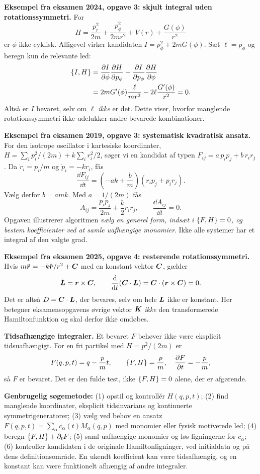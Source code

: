 \textbf{Eksempel fra eksamen 2024, opgave 3: skjult integral uden rotationssymmetri.}
For
\[
H=\frac{p_r^2}{2m}+\frac{p_\phi^2}{2mr^2}+V(r)+\frac{G(\phi)}{r^2}
\]
er $\phi$ ikke cyklisk. Alligevel virker kandidaten
$I=p_\phi^2+2mG(\phi)$. Sæt $\ell=p_\phi$ og beregn kun de relevante led:
\begin{align*}
\left\{I,H\right\}
&=\frac{\partial I}{\partial\phi}\frac{\partial H}{\partial p_\phi}
-\frac{\partial I}{\partial p_\phi}\frac{\partial H}{\partial\phi}\\
&=2mG'(\phi)\frac{\ell}{mr^2}
-2\ell\frac{G'(\phi)}{r^2}=0.
\end{align*}
Altså er $I$ bevaret, selv om $\ell$ \emph{ikke} er det. Dette viser, hvorfor manglende rotationssymmetri ikke udelukker andre bevarede kombinationer.

\textbf{Eksempel fra eksamen 2019, opgave 3: systematisk kvadratisk ansatz.}
For den isotrope oscillator i kartesiske koordinater,
$H=\sum_i p_i^2/(2m)+k\sum_i r_i^2/2$,
søger vi en kandidat af typen
$F_{ij}=a\,p_ip_j+b\,r_ir_j$.
Da $\dot r_i=p_i/m$ og $\dot p_i=-kr_i$, fås
\[
\frac{\dd F_{ij}}{\dd t}
=\left(-ak+\frac bm\right)(r_ip_j+p_ir_j).
\]
Vælg derfor $b=amk$. Med $a=1/(2m)$ fås
\[
\boxed{A_{ij}=\frac{p_ip_j}{2m}+\frac{k}{2}r_ir_j},
\qquad \frac{\dd A_{ij}}{\dd t}=0.
\]
Opgaven illustrerer algoritmen \emph{vælg en generel form, indsæt i $\left\{F,H\right\}=0$, og bestem koefficienter ved at samle uafhængige monomier}. Ikke alle systemer har et integral af den valgte grad.

\textbf{Eksempel fra eksamen 2025, opgave 4: resterende rotationssymmetri.}
Hvis $m\ddot{\boldsymbol{r}}=-k\hat{\boldsymbol{r}}/r^2+\boldsymbol{C}$ med en konstant vektor $\boldsymbol{C}$, gælder
\[
\dot{\boldsymbol{L}}=\boldsymbol{r}\times\boldsymbol{C},\qquad
\frac{\mathrm d}{\mathrm d t}(\boldsymbol{C}\cdot\boldsymbol{L})
=\boldsymbol{C}\cdot(\boldsymbol{r}\times\boldsymbol{C})=0.
\]
Det er altså $D=\boldsymbol{C}\cdot\boldsymbol{L}$, der bevares, selv om hele $\boldsymbol{L}$ ikke er konstant. Her betegner eksamensopgavens øvrige vektor $\boldsymbol{K}$ \emph{ikke} den transformerede Hamiltonfunktion og skal derfor ikke omdøbes.

\textbf{Tidsafhængige integraler.} Et bevaret $F$ behøver ikke være eksplicit tidsuafhængigt. For en fri partikel med $H=p^2/(2m)$ er
\[
F(q,p,t)=q-\frac{p}{m}t,\qquad
\left\{F,H\right\}=\frac pm,\quad \frac{\partial F}{\partial t}=-\frac pm,
\]
så $F$ er bevaret. Det er den fulde test, ikke $\left\{F,H\right\}=0$ alene, der er afgørende.

\begin{method}\textbf{Genbrugelig søgemetode:} (1) opstil og kontrollér $H(q,p,t)$; (2) find manglende koordinater, eksplicit tidsinvarians og kontinuerte symmetrigeneratorer; (3) vælg ved behov en ansatz $F(q,p,t)=\sum_\alpha c_\alpha(t)M_\alpha(q,p)$ med monomier eller fysisk motiverede led; (4) beregn $\left\{F,H\right\}+\partial_tF$; (5) saml uafhængige monomier og løs ligningerne for $c_\alpha$; (6) kontroller kandidaten i de originale Hamiltonligninger, ved initialdata og på dens definitionsområde. En ukendt koefficient kan være tidsafhængig, og en konstant kan være funktionelt afhængig af andre integraler.\end{method}

